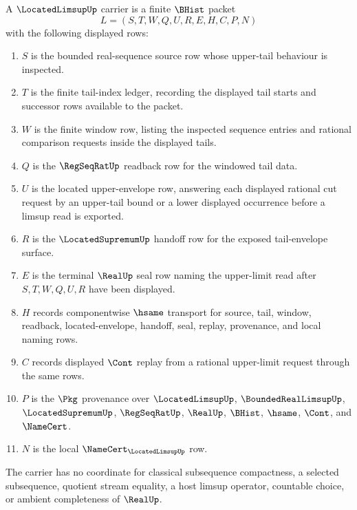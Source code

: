 \begin{definition}
\label{def:located-limsup-carrier}
A $\LocatedLimsupUp$ carrier is a finite $\BHist$ packet
$$
L=(S,T,W,Q,U,R,E,H,C,P,N)
$$
with the following displayed rows:
\begin{enumerate}
\item $S$ is the bounded real-sequence source row whose upper-tail behaviour is inspected.
\item $T$ is the finite tail-index ledger, recording the displayed tail starts and successor rows available to the packet.
\item $W$ is the finite window row, listing the inspected sequence entries and rational comparison requests inside the displayed tails.
\item $Q$ is the $\RegSeqRatUp$ readback row for the windowed tail data.
\item $U$ is the located upper-envelope row, answering each displayed rational cut request by an upper-tail bound or a lower displayed occurrence before a limsup read is exported.
\item $R$ is the $\LocatedSupremumUp$ handoff row for the exposed tail-envelope surface.
\item $E$ is the terminal $\RealUp$ seal row naming the upper-limit read after $S,T,W,Q,U,R$ have been displayed.
\item $H$ records componentwise $\hsame$ transport for source, tail, window, readback, located-envelope, handoff, seal, replay, provenance, and local naming rows.
\item $C$ records displayed $\Cont$ replay from a rational upper-limit request through the same rows.
\item $P$ is the $\Pkg$ provenance over $\LocatedLimsupUp$, $\BoundedRealLimsupUp$, $\LocatedSupremumUp$, $\RegSeqRatUp$, $\RealUp$, $\BHist$, $\hsame$, $\Cont$, and $\NameCert$.
\item $N$ is the local $\NameCert_{\LocatedLimsupUp}$ row.
\end{enumerate}
The carrier has no coordinate for classical subsequence compactness, a selected subsequence, quotient stream equality, a host limsup operator, countable choice, or ambient completeness of $\RealUp$.
\end{definition}

